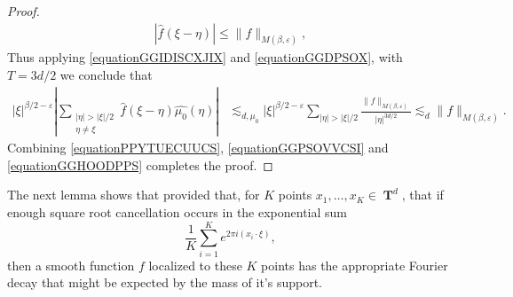 \documentclass[12pt,reqno]{article}
\numberwithin{equation}{section}
\DeclareMathOperator{\TT}{\mathbf{T}}
\begin{document}
\begin{proof}
    \begin{equation} \label{equationGGDPSOX}
    \begin{split}
        |\widehat{f}(\xi - \eta)| \leq \| f \|_{M(\beta,\varepsilon)},
    \end{split}
    \end{equation}
    Thus applying \eqref{equationGGIDISCXJIX} and \eqref{equationGGDPSOX}, with $T = 3d/2$ we conclude that
    \begin{equation} \label{equationGGHOODPPS}
    \begin{split}
        |\xi|^{\beta/2 - \varepsilon} \left| \sum_{\substack{|\eta| > |\xi|/2\\ \eta \neq \xi}} \widehat{f}(\xi - \eta) \widehat{\mu_0}(\eta) \right| &\lesssim_{d,\mu_0} |\xi|^{\beta/2 - \varepsilon} \sum_{|\eta| > |\xi|/2} \frac{\| f \|_{M(\beta,\varepsilon)}}{|\eta|^{3d/2}} \lesssim_d \| f \|_{M(\beta,\varepsilon)}.
    \end{split}
    \end{equation}
    Combining \eqref{equationPPYTUECUUCS}, \eqref{equationGGPSOVVCSI} and \eqref{equationGGHOODPPS} completes the proof.
\end{proof}

The next lemma shows that provided that, for $K$ points $x_1, \dots, x_K \in \TT^d$, that if enough square root cancellation occurs in the exponential sum
%
\[ \frac{1}{K} \sum_{i = 1}^K e^{2 \pi i (x_i \cdot \xi)}, \]
%
then a smooth function $f$ localized to these $K$ points has the appropriate Fourier decay that might be expected by the mass of it's support.
\end{document}
